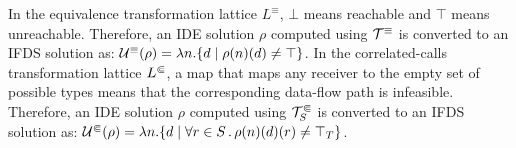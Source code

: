 
In the equivalence transformation lattice $L^\equiv$, $\bot$ means reachable
and $\top$ means unreachable.
Therefore, an IDE solution $\rho$ computed using $\mathcal T^\equiv$ is converted to
an IFDS solution as:
  $\mathcal U^\equiv(\rho) = \lambda n.\{d\mid\rho(n)(d)\ne\top\}$.
%
%
In the correlated-calls transformation lattice $L^\Subset$, a map that maps any receiver
to the empty set of possible types means that the corresponding data-flow path is
infeasible. Therefore, an IDE solution $\rho$ computed using
$\mathcal T^\Subset_S$ is converted to an IFDS solution as:
$\mathcal U^\Subset(\rho) = \lambda n.\{d\mid\forall r\in S\,.\,\rho(n)(d)(r)\neq\top_T\}$.


